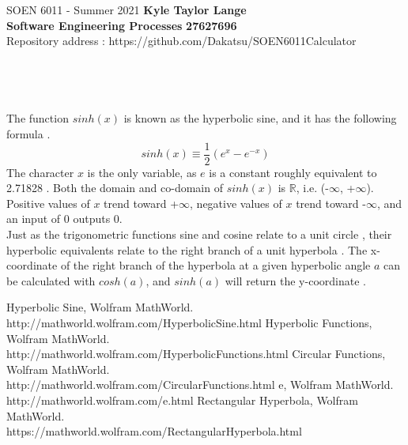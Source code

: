 \documentclass[a4paper, 11pt]{report}
\begin{document}
\section*{}
\normalsize {SOEN 6011 - Summer 2021} \hfill \textbf{Kyle Taylor Lange} \\
\textbf{ Software Engineering Processes}  \hfill \textbf{27627696} \\
\hfill Repository address : https://github.com/Dakatsu/SOEN6011Calculator
\\\\\\\\\\
\normalsize{The function $sinh(x)$ is known as the hyperbolic sine, and it has the following formula \cite{sinh}. 
$$sinh(x) \equiv \frac{1}{2}(e^x-e^{-x})$$
The character $x$ is the only variable, as $e$ is a constant roughly equivalent to 2.71828 \cite{e}. Both the domain and co-domain of $sinh(x)$ is $\mathbb{R}$, i.e. (-$\infty$, +$\infty$). Positive values of $x$ trend toward +$\infty$, negative values of $x$ trend toward -$\infty$, and an input of 0 outputs 0.
\\Just as the trigonometric functions sine and cosine relate to a unit circle \cite{circular}, their hyperbolic equivalents relate to the right branch of a unit hyperbola \cite{hyperbolic}. The x-coordinate of the right branch of the hyperbola at a given hyperbolic angle $a$ can be calculated with $cosh(a)$, and $sinh(a)$ will return the y-coordinate \cite{rectHyperbola}.}
\begin{thebibliography}{}
Hyperbolic Sine, Wolfram MathWorld.
\\http://mathworld.wolfram.com/HyperbolicSine.html
Hyperbolic Functions, Wolfram MathWorld.
\\http://mathworld.wolfram.com/HyperbolicFunctions.html
Circular Functions, Wolfram MathWorld.
\\http://mathworld.wolfram.com/CircularFunctions.html
e, Wolfram MathWorld.
\\http://mathworld.wolfram.com/e.html
Rectangular Hyperbola, Wolfram MathWorld.
\\https://mathworld.wolfram.com/RectangularHyperbola.html
\end{thebibliography}
\pagebreak
\end{document}
